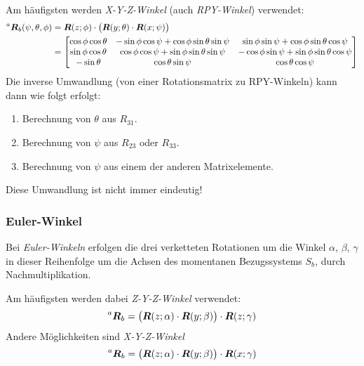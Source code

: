 				Am häufigsten werden \emph{X-Y-Z-Winkel} (auch \emph{RPY-Winkel}) verwendet:
				\begin{align*}
					\prescript{a}{}{\bm{R}}_b(\psi, \theta, \phi) & = \bm{R}(z; \phi) \cdot \big( \bm{R}(y; \theta) \cdot \bm{R}(x; \psi) \big) \\
					                                                 & =
					\begin{bmatrix}
						\cos\phi \cos\theta & -\sin\phi \cos\psi + \cos\phi \sin\theta \sin\psi & \sin\phi \sin\psi + \cos\phi \sin\theta \cos\psi  \\
						\sin\phi \cos\theta & \cos\phi \cos\psi + \sin\phi \sin\theta \sin\psi  & -\cos\phi \sin\psi + \sin\phi \sin\theta \cos\psi \\
						-\sin\theta         & \cos\theta \sin\psi                               & \cos\theta \cos\psi
					\end{bmatrix}
				\end{align*}
				Die inverse Umwandlung (von einer Rotationsmatrix zu RPY-Winkeln) kann dann wie folgt erfolgt:
				\begin{enumerate}
					\item Berechnung von \(\theta\) aus \( R_{31} \).
					\item Berechnung von \(\psi\) aus \( R_{23} \) oder \( R_{33} \).
					\item Berechnung von \(\psi\) aus einem der anderen Matrixelemente.
				\end{enumerate}
				Diese Umwandlung ist nicht immer eindeutig!

			\subsubsection{Euler-Winkel}
				Bei \emph{Euler-Winkeln} erfolgen die drei verketteten Rotationen um die Winkel \(\alpha\), \(\beta\), \(\gamma\) in dieser Reihenfolge um die Achsen des momentanen Bezugssystems \(S_b\), \dh durch Nachmultiplikation.

				Am häufigsten werden dabei \emph{Z-Y-Z-Winkel} verwendet:
				\begin{equation*}
					\prescript{a}{}{\bm{R}}_b = \big( \bm{R}(z; \alpha) \cdot \bm{R}(y; \beta) \big) \cdot \bm{R}(z; \gamma)
				\end{equation*}
				Andere Möglichkeiten sind \zB \emph{X-Y-Z-Winkel}
				\begin{equation*}
					\prescript{a}{}{\bm{R}}_b = \big( \bm{R}(z; \alpha) \cdot \bm{R}(y; \beta) \big) \cdot \bm{R}(x; \gamma)
				\end{equation*}

